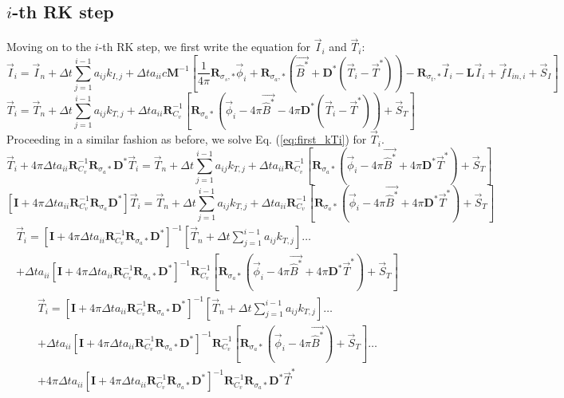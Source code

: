 \documentclass[11pt]{article}
\newcommand{\benum}{\begin{equation}}
\newcommand{\eenum}{\end{equation}}
\newcommand{\be}{\begin{equation*}}
\newcommand{\ee}{\end{equation*}}
\newcommand{\eqt}[1]{Eq. (\ref{#1})}
\newcommand{\M}{\ensuremath{ \mathbf M}}
\newcommand{\R}{\ensuremath{{\mathbf R}}}
\newcommand{\Pvec}{\ensuremath{ \vec{\widehat{B}^*}}}
\newcommand{\D}{\ensuremath{ \mathbf D}^*}
\newcommand{\I}{\ensuremath{\mathbf{I}}}
\begin{document}
\subsection{$i$-th RK step}
Moving on to the $i$-th RK step, we first write the equation for $\vec{I}_i$ and $\vec{T}_{i}$:
\benum
\vec{I}_i = \vec{I}_n + \Delta t \sum_{j=1}^{i-1}{a_{ij} k_{I,j}   } + \Delta t a_{ii} c \M^{-1}\left[
\frac{1}{4\pi}\R_{\sigma_s,*}\vec{\phi}_i +
\R_{\sigma_a,*}\left(\Pvec + \D \left(\vec{T}_i -\vec{T}^*  \right)   \right)- \R_{\sigma_t,*} \vec{I}_i - \mathbf{ L}\vec{I}_i + \vec{f}I_{in,i} + \vec{S}_I
\right]
\label{eq:first_kIi}
\eenum
\benum
\vec{T}_i = \vec{T}_n + \Delta t \sum_{j=1}^{i-1}{a_{ij} k_{T,j}   } + \Delta t a_{ii}\R_{C_v}^{-1}\left[
\R_{\sigma_a*}\left(\vec{\phi}_i - 4\pi\Pvec - 4\pi\D\left( \vec{T}_i - \vec{T}^* \right)\right) + \vec{S}_T 
\right]
\label{eq:first_kTi}
\eenum
%
%
Proceeding in a similar fashion as before, we solve \eqt{eq:first_kTi} for $\vec{T}_{i}$.
%
%
\be
\vec{T}_i +4\pi\Delta t a_{ii}\R_{C_v}^{-1}\R_{\sigma_a*}\D\vec{T}_i = \vec{T}_n + \Delta t \sum_{j=1}^{i-1}{a_{ij} k_{T,j}   } + \Delta t a_{ii}
\R_{C_v}^{-1}\left[
\R_{\sigma_a*} \left(\vec{\phi}_i - 4\pi\Pvec + 4\pi\D\vec{T}^* \right) + \vec{S}_T
 \right]
\ee
%
%
\be
\left[\I + 4\pi\Delta t a_{ii}\R_{C_v}^{-1}\R_{\sigma_a}\D  \right]\vec{T}_i = \vec{T}_n + \Delta t \sum_{j=1}^{i-1}{a_{ij} k_{T,j}   } + \Delta t a_{ii}\R_{C_v}^{-1}\left[\R_{\sigma_a*} \left(\vec{\phi}_i - 4\pi\Pvec + 4\pi\D\vec{T}^* \right) + \vec{S}_T \right]
\ee
%
%
\begin{multline*}
\vec{T}_i = \left[\I+ 4\pi\Delta t a_{ii}\R_{C_v}^{-1}\R_{\sigma_a*}\D  \right]^{-1}\left[\vec{T}_n + \Delta t \sum_{j=1}^{i-1}{a_{ij} k_{T,j}   }\right] \dots \\
+ \Delta t a_{ii}\left[\I+  4\pi\Delta t a_{ii}\R_{C_v}^{-1}\R_{\sigma_a*}\D  \right]^{-1}\R_{C_v}^{-1}\left[
\R_{\sigma_a*} \left(\vec{\phi}_i - 4\pi\Pvec + 4\pi\D\vec{T}^* \right) + \vec{S}_T 
\right] 
\end{multline*}
%
%
\begin{multline*}
\vec{T}_i = \left[\I +4\pi\Delta t a_{ii}\R_{C_v}^{-1}\R_{\sigma_a*}\D  \right]^{-1}\left[\vec{T}_n + \Delta t \sum_{j=1}^{i-1}{a_{ij} k_{T,j}   }\right] \dots \\
+ \Delta t a_{ii}\left[\I +4\pi\Delta t a_{ii}\R_{C_v}^{-1}\R_{\sigma_a*}\D  \right]^{-1}
\R_{C_v}^{-1}\left[ \R_{\sigma_a*}\left(\vec{\phi}_i - 4\pi\Pvec\right)  + \vec{S}_T \right]\dots \\
+4\pi\Delta t a_{ii}\left[\I + 4\pi\Delta t a_{ii}\R_{C_v}^{-1}\R_{\sigma_a*}\D  \right]^{-1}
\R_{C_v}^{-1}\R_{\sigma_a*}\D\vec{T}^*
\end{multline*}
\end{document}
